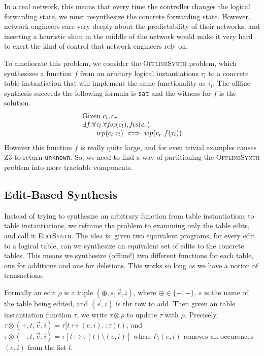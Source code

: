 In a real network, this means that every time the
controller changes the logical forwarding state, we must resynthesize the
concrete forwarding state. However, network engineers care very deeply about the
predictability of their networks, and inserting a heuristic shim in the middle
of the network would make it very hard to exert the kind of control that network
engineers rely on.

To ameliorate this problem, we consider the \textsc{OfflineSynth} problem, which
synthesizes a function $f$ from an arbitary logical instantiations $\tau_l$ to a
concrete table instantiation that will implement the same functionality as
$\tau_l$. The offline synthesis succeeds the following formula is \texttt{sat}
and the witness for $f$ is the solution.
\[\begin{array}{l}
    \text{Given } c_l,c_r\\
    \exists f. \forall \tau_l. \forall \mathit{fvs}(c_l), \mathit{fvs}(c_r). \\
    \qquad wp(c_l\; \tau_l) \iff wp(c_r\; f(\tau_l))
  \end{array}\]
However this function $f$ is really quite large, and for even trivial
examples causes Z3 to return \texttt{unknown}. So, we need to find a way of
partitioning the \textsc{OfflineSynth} problem into more tractable
components.

\subsection{Edit-Based Synthesis}

Instead of trying to synthesize an arbitrary function from table instantiations
to table instantiations, we reframe the problem to examining only the table
edits, and call it \textsc{EditSynth}. The idea is: given two equivalent
programs, for every edit to a logical table, can we synthesize an equivalent set
of edits to the concrete tables. This means we synthesize (offline!) two
different functions for each table, one for additions and one for
deletions. This works so long as we have a notion of transactions.


Formally an edit $\rho$ is a tuple $(\oplus,s,\vec e,i)$, where
$\oplus \in \{+,-\}$, $s$ is the name of the table being edited, and
$(\vec e, i)$ is thr row to add. Then given an table instantiation function
$\tau$, we write $\tau \otimes \rho$ to update $\tau$ with $\rho$. Precisely,
$\tau \otimes (+,t,\vec e, i) = \tau[t \mapsto (e,i)::\tau(t)$, and
$\tau \otimes (-, t, \vec e, i) = \tau[t \mapsto \tau(t) \setminus (e,i)]$ where
$l \setminus (e,i)$ removes all occurences $(e,i)$ from the list $l$.


